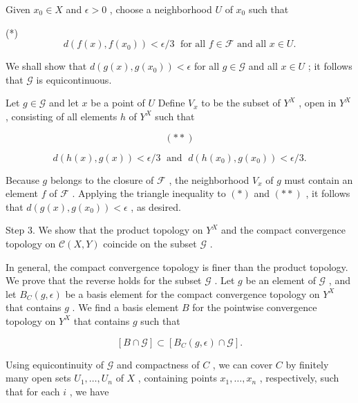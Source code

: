 Given \({x}_{0} \in  X\) and \(\epsilon  > 0\) , choose a neighborhood \(U\) of \({x}_{0}\) such that

(*)
\[
d\left( {f\left( x\right) ,f\left( {x}_{0}\right) }\right)  < \epsilon /3\;\text{ for all }f \in  \mathcal{F}\text{ and all }x \in  U.
\]

We shall show that \(d\left( {g\left( x\right) ,g\left( {x}_{0}\right) }\right)  < \epsilon\) for all \(g \in  \mathcal{G}\) and all \(x \in  U\) ; it follows that \(\mathcal{G}\) is equicontinuous.

Let \(g \in  \mathcal{G}\) and let \(x\) be a point of \(U\) Define \({V}_{x}\) to be the subset of \({Y}^{X}\) , open in \({Y}^{X}\) , consisting of all elements \(h\) of \({Y}^{X}\) such that

\[
\left( {* * }\right)
\]

\[
d\left( {h\left( x\right) ,g\left( x\right) }\right)  < \epsilon /3\;\text{ and }\;d\left( {h\left( {x}_{0}\right) ,g\left( {x}_{0}\right) }\right)  < \epsilon /3.
\]

Because \(g\) belongs to the closure of \(\mathcal{F}\) , the neighborhood \({V}_{x}\) of \(g\) must contain an element \(f\) of \(\mathcal{F}\) . Applying the triangle inequality to \(\left( *\right)\) and \(\left( {* * }\right)\) , it follows that \(d\left( {g\left( x\right) ,g\left( {x}_{0}\right) }\right)  < \epsilon\) , as desired.

Step 3. We show that the product topology on \({Y}^{X}\) and the compact convergence topology on \(\mathcal{C}\left( {X,Y}\right)\) coincide on the subset \(\mathcal{G}\) .

In general, the compact convergence topology is finer than the product topology. We prove that the reverse holds for the subset \(\mathcal{G}\) . Let \(g\) be an element of \(\mathcal{G}\) , and let \({B}_{C}\left( {g,\epsilon }\right)\) be a basis element for the compact convergence topology on \({Y}^{X}\) that contains \(g\) . We find a basis element \(B\) for the pointwise convergence topology on \({Y}^{X}\) that contains \(g\) such that

\[
\left\lbrack  {B \cap  \mathcal{G}}\right\rbrack   \subset  \left\lbrack  {{B}_{C}\left( {g,\epsilon }\right)  \cap  \mathcal{G}}\right\rbrack  .
\]

Using equicontinuity of \(\mathcal{G}\) and compactness of \(C\) , we can cover \(C\) by finitely many open sets \({U}_{1},\ldots ,{U}_{n}\) of \(X\) , containing points \({x}_{1},\ldots ,{x}_{n}\) , respectively, such that for each \(i\) , we have


